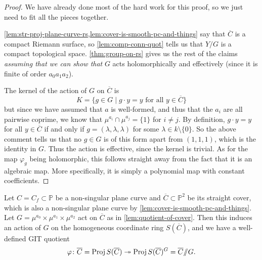 \documentclass[10pt,notitlepage]{article}
\numberwithin{equation}{subsection}
\DeclareMathOperator{\proj}{Proj}
\newcommand{\pee}{\mathbb{P}}
\newcommand{\noz}{\setminus\{0\}}
\newcommand{\cover}[1]{\overline{#1}}
\newcommand{\sslash}{/\!\!/}
\begin{document}
        \begin{proof}
            We have already done most of the hard work for this proof, so we just need to fit all the pieces together.

            \cref{lem:str-proj-plane-curve-rs,lem:cover-is-smooth-pc-and-things} say that $\cover{C}$ is a compact Riemann surface, so \cref{lem:comp-conn-quot} tells us that $Y/G$ is a compact topological space.
            \cref{thm:group-on-rs} gives us the rest of the claims \emph{assuming that we can show that} $G$ acts holomorphically and effectively (since it is finite of order $a_0a_1a_2$).

            The kernel of the action of $G$ on $\cover{C}$ is
            \[
                K = \{g\in G\mid g\cdot y = y\text{ for all }y\in \cover{C}\}
            \]
            but since we have assumed that $a$ is well-formed, and thus that the $a_i$ are all pairwise coprime, we know that $\mu^{a_i}\cap\mu^{a_j}=\{1\}$ for $i\neq j$.
            By definition, $g\cdot y=y$ for all $y\in\cover{C}$ if and only if $g=(\lambda,\lambda,\lambda)$ for some $\lambda\in k\noz$.
            So the above comment tells us that no $g\in G$ is of this form apart from $(1,1,1)$, which is the identity in $G$.
            Thus the action is effective, since the kernel is trivial.
            As for the map $\varphi_g$ being holomorphic, this follows straight away from the fact that it is an algebraic map.
            More specifically, it is simply a polynomial map with constant coefficients.
        \end{proof}

        \begin{lemma}\label{lem:git-quotient-exists}
            Let $C=C_f\subset\pee$ be a non-singular plane curve and $\cover{C}\subset\pee^2$ be its straight cover, which is also a non-singular plane curve by \cref{lem:cover-is-smooth-pc-and-things}.
            Let $G=\mu^{a_0}\times\mu^{a_1}\times\mu^{a_2}$ act on $\cover{C}$ as in \cref{lem:quotient-of-cover}.
            Then this induces an action of $G$ on the homogeneous coordinate ring $S(\cover{C})$, and we have a well-defined GIT quotient
            \[
                \varphi\colon\cover{C}=\proj S(\cover{C})\twoheadrightarrow\proj S(\cover{C})^G=\cover{C}\sslash G.\qedhere
            \]
        \end{lemma}
\end{document}
